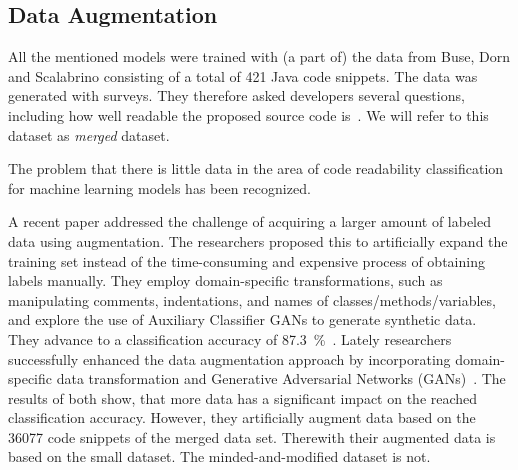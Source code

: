\documentclass[%
class=scrreprt,
chapterprefix=false,%
open=right,%
twoside=false,%
paper=a4,%
logofile={Logo\_zentral\_farbig\_EN.png},%
thesistype=master,%
UKenglish,%
]{se2thesis}
\theoremstyle{definition}
\newcommand{\numOriginal}{36077 }
\begin{document}
\subsection{Data Augmentation} \label{Data Augmentation}

	All the mentioned models were trained with (a part of) the data from Buse, Dorn and Scalabrino consisting of a total of 421 Java code snippets. The data was generated with surveys. They therefore asked developers several questions, including how well readable the proposed source code is~\cite{buse2009learning, dorn2012general, scalabrino2018comprehensive}. We will refer to this dataset as \textit{merged} dataset.
	
	
	The problem that there is little data in the area of code readability classification for machine learning models has been recognized.
					
	A recent paper addressed the challenge of acquiring a larger amount of labeled data using augmentation. The researchers proposed this to artificially expand the training set instead of the time-consuming and expensive process of obtaining labels manually. They employ domain-specific transformations, such as manipulating comments, indentations, and names of classes/methods/variables, and explore the use of Auxiliary Classifier GANs to generate synthetic data. They advance to a classification accuracy of 87.3~\%~\cite{mi2021effectiveness}.
	Lately researchers successfully enhanced the data augmentation approach by incorporating domain-specific data transformation and Generative Adversarial Networks (GANs)~\cite{mi2022enhanced}.
	The results of both show, that more data has a significant impact on the reached classification accuracy. However, they artificially augment data based on the \numOriginal code snippets of the merged data set. Therewith their augmented data is based on the small dataset. The minded-and-modified dataset is not.
	
\end{document}

